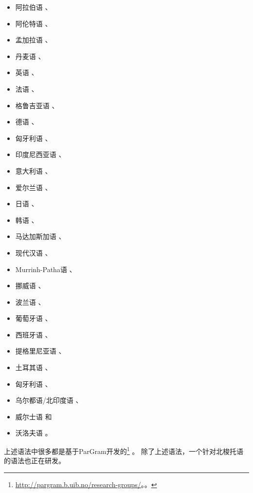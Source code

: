 \begin{itemize}
\item 阿拉伯语 \citep{Attia2008a-u}、
\item 阿伦特语 \citep*{Dras2012a-u}、
\item 孟加拉语  \citep{SC97a-u}、
\item 丹麦语 \citep{Oersnes2002b-u,OW2003a-u,OW2004a-u}、
\item 英语 \citep*{HHP91a-u,BDFK99a-u,RKKCMJ2002a-u,KM2007a-u}、
\item 法语 \citep*{Zweigenbaum91a-u,Frank96b-u,FZ2002a-u,BDFK99a-u,CK2001a-u,BSL2005a-u,SdA2016a-u,Alencar2017a-u}、
%
%
\item 格鲁吉亚语 \citep{Meurer2009a-u}、
\item 德语 \citep{Rohrer96a,Berman96a-u,KR97a-u,BDFK99a-u,Dipper2003a-u,RF2006a,Forst2006a-u,Frank2006a-u,FR2009a-u}、
\item 匈牙利语 \citep{LRT2010a-u}、
\item 印度尼西亚语 \citep*{AADMS2009a-u}、
\item 意大利语 \citep*{Delmonte90a-u,Mayo99a-u,Quaglia2012a-u}、
\item 爱尔兰语 \citep{Sulger2009a-u,Sulger2010a-u}、
\item 日语 \citep*{HHP91a-u,MO2003a-u,Umemoto2006a-u}、
\item 韩语 \citep*{HHP91a-u}、
\item 马达加斯加语 \citep*{Randriamasimanana2006a-u,DLM2006a-u}、
\item 现代汉语 \citep*{HHP91a-u,FK2007a-u}、
\item Murrinh-Patha语 \citep{SN2012a-u}、
\item 挪威语 \citep*{DMR2005a}、
\item 波兰语 \citep*{PP2012a-u}、
\item 葡萄牙语 \citep{Alencar2004a-u,Alencar2013a-u,Alencar2015a-u}、
\item 西班牙语 \citep{Mayo99a-u}、
\item 提格里尼亚语 \citep{Kifle2012a-u}、
\item 土耳其语 \citep{CO2006a-u}、
\item 匈牙利语 \citep*{LRT2010a-u,RLC2011a-u}、
\item 乌尔都语/北印度语 \citep*{BHKR2007a-u,BBS2008a-u}、
\item 威尔士语 \citep{MS2005a-u}
和
\item 沃洛夫语 \citep{Dione2012b-u,Dione2013a-u}。
\end{itemize}
上述语法中很多都是基于ParGram开发的\footnote{%
  \url{http://pargram.b.uib.no/research-groups/}。。
} \citep*{BKNS99a-ed,BDKMR02a-u}。 
除了上述语法，一个针对北梭托语的语法也正在研发\citep{Faasz2010a-u}。


